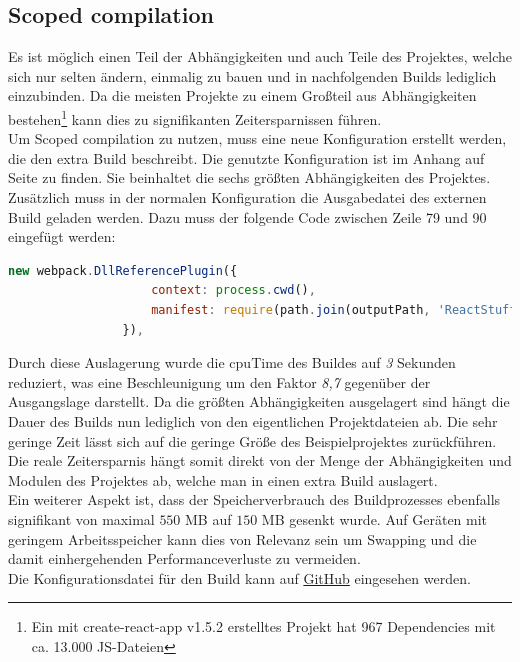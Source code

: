 \documentclass[11pt]{report}
\begin{document}

        	\subsection{Scoped compilation}
        		\label{section:scopedCompilation}
        		Es ist möglich einen Teil der Abhängigkeiten und auch Teile des Projektes, welche sich nur selten ändern, einmalig zu bauen und in nachfolgenden Builds lediglich einzubinden. Da die meisten Projekte zu einem Großteil aus Abhängigkeiten bestehen\footnote{Ein mit create-react-app v1.5.2 erstelltes Projekt hat 967 Dependencies mit ca. 13.000 JS-Dateien} kann dies zu signifikanten Zeitersparnissen führen.\\
        		Um Scoped compilation zu nutzen, muss eine neue Konfiguration erstellt werden, die den extra Build beschreibt. Die genutzte Konfiguration ist im Anhang auf Seite \pageref{vendorConfig} zu finden. Sie beinhaltet die sechs größten Abhängigkeiten des Projektes. Zusätzlich muss in der normalen Konfiguration die Ausgabedatei des externen Build geladen werden. Dazu muss der folgende Code zwischen Zeile 79 und 90 eingefügt werden:\\
        		\begin{center}
		        	\lstset{%
					    caption=Einbindung der Scoped compilation,
						basicstyle=\footnotesize,
						numbers=none
					}
		        	\begin{lstlisting}[language=JavaScript]
						new webpack.DllReferencePlugin({
		            context: process.cwd(),
		            manifest: require(path.join(outputPath, 'ReactStuff.json'))
		        }),
		        	\end{lstlisting}
	        	\end{center}
        		
        		Durch diese Auslagerung wurde die \Gls{cpuTime} des Buildes auf \emph{3} Sekunden reduziert, was eine Beschleunigung um den Faktor \emph{8,7} gegenüber der Ausgangslage darstellt. Da die größten Abhängigkeiten ausgelagert sind hängt die Dauer des Builds nun lediglich von den eigentlichen Projektdateien ab. Die sehr geringe Zeit lässt sich auf die geringe Größe des Beispielprojektes zurückführen. Die reale Zeitersparnis hängt somit direkt von der Menge der Abhängigkeiten und Modulen des Projektes ab, welche man in einen extra Build auslagert.\\
        		Ein weiterer Aspekt ist, dass der Speicherverbrauch des Buildprozesses ebenfalls signifikant von maximal $550$ MB auf $150$ MB gesenkt wurde. Auf Geräten mit geringem Arbeitsspeicher kann dies von Relevanz sein um Swapping und die damit einhergehenden Performanceverluste zu vermeiden.\\
        		Die Konfigurationsdatei für den Build kann auf \href{https://github.com/TexNAK/WebBundlerOptimization/compare/master...nondestr_scopedCompilation#diff-1fb5683b1e7adbcee273b7f9f9a08a22}{GitHub} eingesehen werden.
\end{document}
